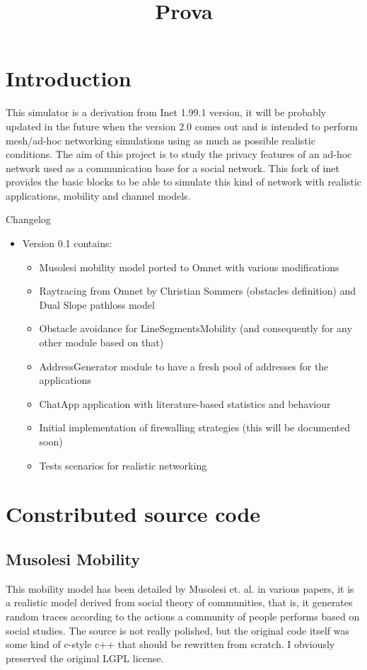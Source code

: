 \documentclass[12pt, a4]{article}
\date{}
\theoremstyle{definition}
\begin{document}
%
%
\title{Prova}

\tableofcontents              
\newpage

\section{Introduction}

This simulator is a derivation from Inet 1.99.1 version, it will be probably
updated in the future when the version 2.0 comes out and is intended to perform
mesh/ad-hoc networking simulations using as much as possible realistic
conditions. 
The aim of this project is to study the privacy features of an ad-hoc network
used as a communication base for a social network. This fork of inet provides
the basic blocks to be able to simulate this kind of network with realistic
applications, mobility and channel models. 

Changelog
\begin{itemize}
\item Version 0.1 contains:
\begin{itemize}
\item Musolesi mobility model ported to Omnet with various modifications
\item Raytracing from Omnet by Christian Sommers (obstacles definition) and
Dual Slope pathloss model
\item Obstacle avoidance for LineSegmentsMobility (and consequently for any
other module based on that)
\item AddressGenerator module to have a fresh pool of addresses for the
applications
\item ChatApp application with literature-based statistics and behaviour
\item Initial implementation of firewalling strategies (this will be documented
soon)
\item Tests scenarios for realistic networking
\end{itemize}
\end{itemize} 
\section{Constributed source code}

\subsection{Musolesi Mobility}
This mobility model has been detailed by Musolesi et. al. in various papers, it
is a realistic model derived from social theory of communities, that is, it
generates random traces according to the actions a community of people performs
based on social studies.  The source is not really polished, but the original
code itself was some kind of c-style c++ that should be rewritten from scratch.
I obviously preserved the original LGPL license.
\end{document}
